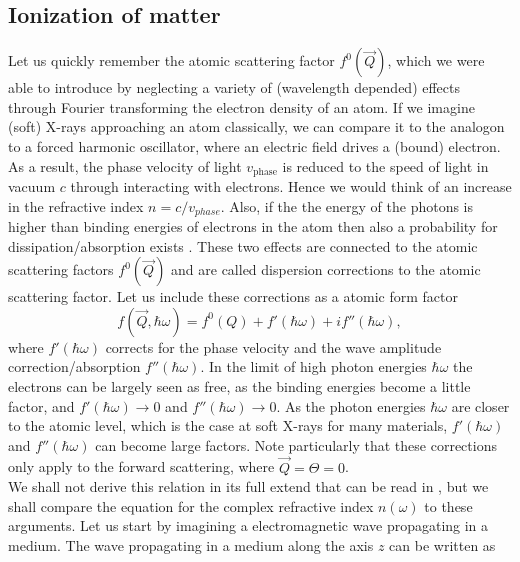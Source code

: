 \subsection{Ionization of matter}\label{sec:absorption}
Let us quickly remember the atomic scattering factor $f^{0}\left(\vec{Q}\right)$, which we were able to introduce by neglecting a variety of (wavelength depended) effects through Fourier transforming the electron density of an atom. If we imagine (soft) X-rays approaching an atom classically, we can compare it to the analogon to a forced harmonic oscillator, where an electric field drives a (bound) electron. As a result, the phase velocity of light $v_{\text{phase}}$ is reduced to the speed of light in vacuum $c$ through interacting with electrons. Hence we would think of an increase in the refractive index $n=c/v_{phase}$. Also, if the the energy of the photons is higher than binding energies of electrons in the atom then also a probability for dissipation/absorption exists \citep{Als-Nielson-2011-JWS,Attwood-2007-CUP}. These two effects are connected to the atomic scattering factors $f^{0}\left(\vec{Q}\right)$ and are called dispersion corrections to the atomic scattering factor. Let us include these corrections as a atomic form factor
\begin{equation}
f\left(\vec{Q},\hbar\omega\right)=f^{0}\left(Q\right)+f'\left(\hbar\omega\right)+i f''\left(\hbar\omega\right),
\label{eq:scattering-factor-dispersion-corr}
\end{equation}
where $f'\left(\hbar\omega\right)$ corrects for the phase velocity and the wave amplitude correction/absorption $f''\left(\hbar\omega\right)$. In the limit of high photon energies $\hbar \omega$ the electrons can be largely seen as free, as the binding energies become a little factor, and $f'\left(\hbar\omega\right)\rightarrow 0$ and $f''\left(\hbar\omega\right)\rightarrow 0$. As the photon energies $\hbar \omega$ are closer to the atomic level, which is the case at soft X-rays for many materials, $f'\left(\hbar\omega\right)$ and $f''\left(\hbar\omega\right)$ can become large factors. Note particularly that these corrections only apply to the forward scattering, where $\vec{Q}=\Theta=0$.\\
We shall not derive this relation in its full extend that can be read in \citep[see][p. 55ff]{Attwood-2007-CUP}, but we shall compare the equation for the complex refractive index $n\left(\omega\right)$ to these arguments. Let us start by imagining a electromagnetic wave propagating in a medium. The wave propagating in a medium along the axis $z$ can be written as
